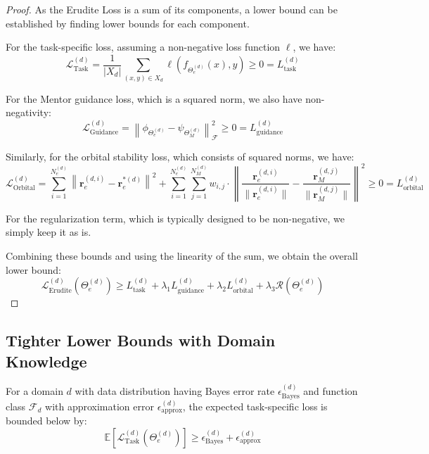\begin{proof}
As the Erudite Loss is a sum of its components, a lower bound can be established by finding lower bounds for each component.

For the task-specific loss, assuming a non-negative loss function $\ell$, we have:
\begin{equation}
\mathcal{L}_{\text{Task}}^{(d)} = \frac{1}{|X_d|}\sum_{(x,y) \in X_d} \ell\left(f_{\Theta_e^{(d)}}(x), y\right) \geq 0 = L_{\text{task}}^{(d)}
\end{equation}

For the Mentor guidance loss, which is a squared norm, we also have non-negativity:
\begin{equation}
\mathcal{L}_{\text{Guidance}}^{(d)} = \left\|\phi_{\Theta_e^{(d)}} - \psi_{\Theta_M^{(d)}}\right\|^2_{\mathcal{F}} \geq 0 = L_{\text{guidance}}^{(d)}
\end{equation}

Similarly, for the orbital stability loss, which consists of squared norms, we have:
\begin{equation}
\mathcal{L}_{\text{Orbital}}^{(d)} = \sum_{i=1}^{N_e^{(d)}} \left\|\mathbf{r}_e^{(d,i)} - \mathbf{r}_e^{*(d)}\right\|^2 + \sum_{i=1}^{N_e^{(d)}} \sum_{j=1}^{N_M^{(d)}} w_{i,j} \cdot \left\|\frac{\mathbf{r}_e^{(d,i)}}{\|\mathbf{r}_e^{(d,i)}\|} - \frac{\mathbf{r}_M^{(d,j)}}{\|\mathbf{r}_M^{(d,j)}\|}\right\|^2 \geq 0 = L_{\text{orbital}}^{(d)}
\end{equation}

For the regularization term, which is typically designed to be non-negative, we simply keep it as is.

Combining these bounds and using the linearity of the sum, we obtain the overall lower bound:
\begin{equation}
\mathcal{L}_{\text{Erudite}}^{(d)}(\Theta_e^{(d)}) \geq L_{\text{task}}^{(d)} + \lambda_1 L_{\text{guidance}}^{(d)} + \lambda_2 L_{\text{orbital}}^{(d)} + \lambda_3 \mathcal{R}(\Theta_e^{(d)})
\end{equation}
\end{proof}

\subsection{Tighter Lower Bounds with Domain Knowledge}

\begin{theorem}
For a domain $d$ with data distribution having Bayes error rate $\epsilon_{\text{Bayes}}^{(d)}$ and function class $\mathcal{F}_d$ with approximation error $\epsilon_{\text{approx}}^{(d)}$, the expected task-specific loss is bounded below by:
\begin{equation}
\mathbb{E}[\mathcal{L}_{\text{Task}}^{(d)}(\Theta_e^{(d)})] \geq \epsilon_{\text{Bayes}}^{(d)} + \epsilon_{\text{approx}}^{(d)}
\end{equation}
\end{theorem}

